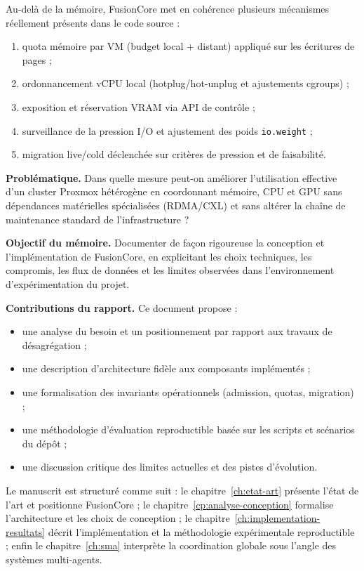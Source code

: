 Au-delà de la mémoire, FusionCore met en cohérence plusieurs mécanismes réellement présents dans le code source :
\begin{enumerate}
    \item quota mémoire par VM (budget local + distant) appliqué sur les écritures de pages ;
    \item ordonnancement vCPU local (hotplug/hot-unplug et ajustements cgroups) ;
    \item exposition et réservation VRAM via API de contrôle ;
    \item surveillance de la pression I/O et ajustement des poids \texttt{io.weight} ;
    \item migration live/cold déclenchée sur critères de pression et de faisabilité.
\end{enumerate}

\textbf{Problématique.} Dans quelle mesure peut-on améliorer l’utilisation effective d’un cluster Proxmox hétérogène en coordonnant mémoire, CPU et GPU sans dépendances matérielles spécialisées (RDMA/CXL) et sans altérer la chaîne de maintenance standard de l’infrastructure ?

\textbf{Objectif du mémoire.} Documenter de façon rigoureuse la conception et l’implémentation de FusionCore, en explicitant les choix techniques, les compromis, les flux de données et les limites observées dans l’environnement d’expérimentation du projet.

\textbf{Contributions du rapport.} Ce document propose :
\begin{itemize}
    \item une analyse du besoin et un positionnement par rapport aux travaux de désagrégation ;
    \item une description d’architecture fidèle aux composants implémentés ;
    \item une formalisation des invariants opérationnels (admission, quotas, migration) ;
    \item une méthodologie d’évaluation reproductible basée sur les scripts et scénarios du dépôt ;
    \item une discussion critique des limites actuelles et des pistes d’évolution.
\end{itemize}

Le manuscrit est structuré comme suit : le chapitre~\ref{ch:etat-art} présente l’état de l’art et positionne FusionCore ; le chapitre~\ref{cp:analyse-conception} formalise l’architecture et les choix de conception ; le chapitre~\ref{ch:implementation-resultats} décrit l’implémentation et la méthodologie expérimentale reproductible ; enfin le chapitre~\ref{ch:sma} interprète la coordination globale sous l’angle des systèmes multi-agents.
